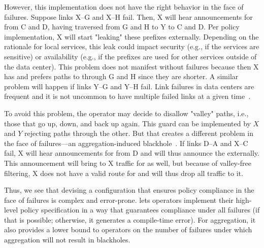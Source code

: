 However, this implementation does not have the right behavior in the face of failures. Suppose links X--G and X--H fail. Then, X will hear announcements for  from C and D, having traversed from G and H to Y to C and D. Per policy implementation, X will start "leaking" these prefixes externally. Depending on the rationale for local services, this leak could impact security (e.g., if the services are sensitive) or availability (e.g., if the  prefixes are used for other services outside of the data center). This problem does not manifest without failures because then X has and prefers paths to  through G and H since they are shorter. A similar problem will happen if links Y--G and Y--H fail.
Link failures in data centers are frequent and it is not uncommon to have multiple failed links at a given time~\cite{dc-failure-study}.

To avoid this problem, the operator may decide to disallow "valley" paths, i.e., those that go up, down, and back up again. This guard can be implemented by $X$ and $Y$ rejecting paths through the other. But that creates a different problem in the face of failures---an aggregation-induced blackhole~\cite{route-aggregation}. If links D--A and X--C fail, X will hear announcements for  from D and will thus announce the  externally. This announcement will bring to X traffic for  as well, but because of valley-free filtering, X does not have a valid route for  and will thus drop all traffic to it.

Thus, we see that devising a configuration that ensures policy compliance in the face of failures is complex and error-prone. \sysname lets operators implement their high-level policy specification in a way that guarantees compliance under all failures (if that is possible; otherwise, it generates a compile-time error). For aggregation, it also provides a lower bound to operators on the number of failures under which aggregation will not result in blackholes.



